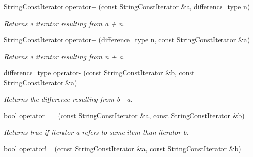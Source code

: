 \begin{DoxyCompactItemize}
\item 
\hyperlink{struct_mdt_1_1_plain_text_1_1_string_const_iterator}{String\+Const\+Iterator} \hyperlink{struct_mdt_1_1_plain_text_1_1_string_const_iterator_aa6f9bb8b739cc2e480b3832e51f2311b}{operator+} (const \hyperlink{struct_mdt_1_1_plain_text_1_1_string_const_iterator}{String\+Const\+Iterator} \&a, difference\+\_\+type n)
\begin{DoxyCompactList}\small\item\em Returns a iterator resulting from {\itshape a} + {\itshape n}. \end{DoxyCompactList}\item 
\hyperlink{struct_mdt_1_1_plain_text_1_1_string_const_iterator}{String\+Const\+Iterator} \hyperlink{struct_mdt_1_1_plain_text_1_1_string_const_iterator_abeed2837c5315658a676d9761bfd5f56}{operator+} (difference\+\_\+type n, const \hyperlink{struct_mdt_1_1_plain_text_1_1_string_const_iterator}{String\+Const\+Iterator} \&a)
\begin{DoxyCompactList}\small\item\em Returns a iterator resulting from {\itshape n} + {\itshape a}. \end{DoxyCompactList}\item 
difference\+\_\+type \hyperlink{struct_mdt_1_1_plain_text_1_1_string_const_iterator_a2b48d08e991c1a53e135d72a92ba9519}{operator-\/} (const \hyperlink{struct_mdt_1_1_plain_text_1_1_string_const_iterator}{String\+Const\+Iterator} \&b, const \hyperlink{struct_mdt_1_1_plain_text_1_1_string_const_iterator}{String\+Const\+Iterator} \&a)
\begin{DoxyCompactList}\small\item\em Returns the difference resulting from {\itshape b} -\/ {\itshape a}. \end{DoxyCompactList}\item 
bool \hyperlink{struct_mdt_1_1_plain_text_1_1_string_const_iterator_a8d4013367bdb5651af369fb6dbd20361}{operator==} (const \hyperlink{struct_mdt_1_1_plain_text_1_1_string_const_iterator}{String\+Const\+Iterator} \&a, const \hyperlink{struct_mdt_1_1_plain_text_1_1_string_const_iterator}{String\+Const\+Iterator} \&b)
\begin{DoxyCompactList}\small\item\em Returns true if iterator a refers to same item than iterator b. \end{DoxyCompactList}\item 
bool \hyperlink{struct_mdt_1_1_plain_text_1_1_string_const_iterator_a501d2ca93f0e5ebb68adbbc3a2c51d94}{operator!=} (const \hyperlink{struct_mdt_1_1_plain_text_1_1_string_const_iterator}{String\+Const\+Iterator} \&a, const \hyperlink{struct_mdt_1_1_plain_text_1_1_string_const_iterator}{String\+Const\+Iterator} \&b)

\end{DoxyCompactItemize}
